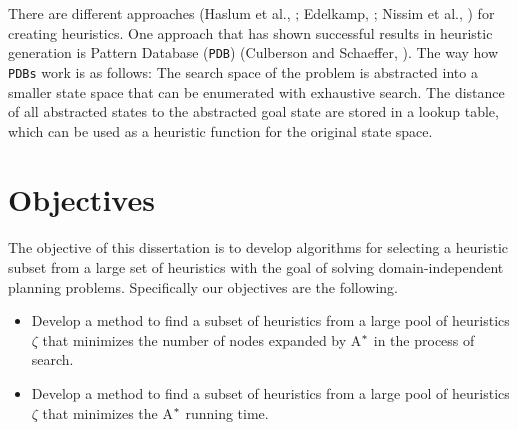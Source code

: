 There are different approaches (Haslum et al., \citeyear{haslum2007domain}; Edelkamp, \citeyear{edelkamp2007automated}; Nissim et al., \citeyear{nissim2011computing}) for creating heuristics. %
One approach that has shown successful results in heuristic generation is Pattern Database (\texttt{PDB}) (Culberson and Schaeffer, \citeyear{culberson1998pattern}). The way how \texttt{PDBs} work is as follows: The search space of the problem is abstracted into a smaller state space that can be enumerated with exhaustive search. The distance of all abstracted states to the abstracted goal state are stored in a lookup table, which can be used as a heuristic function for the original state space.

\section{Objectives}
The objective of this dissertation is to develop algorithms for selecting a heuristic subset from a large set of heuristics with the goal of solving domain-independent planning problems. Specifically our objectives are the following. 


\begin{itemize}
  \item Develop a method to find a subset of heuristics from a large pool of heuristics $\zeta$ that minimizes the number of nodes expanded by A$\sp{*}$ in the process of search.
  
  \item Develop a method to find a subset of heuristics from a large pool of heuristics $\zeta$ that minimizes the A$\sp{*}$ running time.

\end{itemize}
